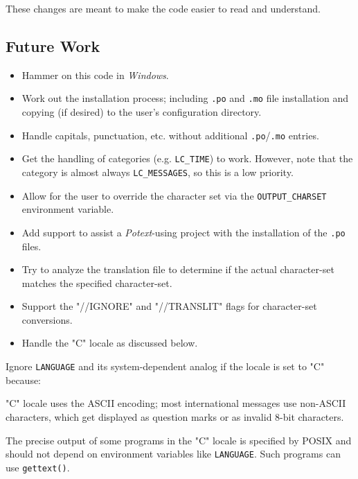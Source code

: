 \documentclass[
 11pt,
 twoside,
 a4paper,
 final                                 %
]{article}
\begin{document}
   These changes are meant to make the code easier to read and understand.

\subsection{Future Work}
\label{subsec:introduction_future}

   \begin{itemize}
      \item Hammer on this code in \textsl{Windows}.
      \item Work out the installation process; including \texttt{.po}
         and \texttt{.mo} file
         installation and copying (if desired)
         to the user's configuration directory.
      \item Handle capitals, punctuation, etc. without additional
         \texttt{.po}/\texttt{.mo} entries.
      \item Get the handling of categories (e.g. \texttt{LC\_TIME}) to
         work. However, note that the category is almost always
         \texttt{LC\_MESSAGES}, so this is a low priority.
      \item Allow for the user to override the character set via the
         \texttt{OUTPUT\_CHARSET} environment variable.
      \item Add support to assist a \textsl{Potext}-using project with the
         installation of the \texttt{.po} files.
      \item Try to analyze the translation file to determine if the
         actual character-set matches the specified character-set.
      \item Support the "//IGNORE" and "//TRANSLIT" flags for character-set
         conversions.
      \item Handle the "C" locale as discussed below.
   \end{itemize}

   Ignore \texttt{LANGUAGE} and its system-dependent analog if the locale is
   set to "C" because:

   \begin{enumber}
      \item "C" locale uses the ASCII encoding; most international
         messages use non-ASCII characters, which get displayed
         as question marks or as invalid 8-bit characters.
      \item The precise output of some programs in the "C" locale
         is specified by POSIX and should not depend on environment
         variables like \texttt{LANGUAGE}.  Such programs can use
         \texttt{gettext()}.
   \end{enumber}
\end{document}
